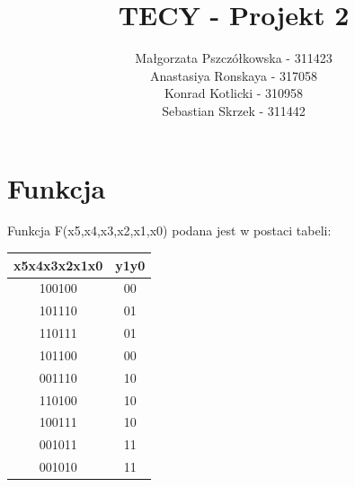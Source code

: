 \documentclass[]{article}
\title{TECY - Projekt 2}
\author{Małgorzata Pszczółkowska - 311423\\ Anastasiya Ronskaya - 317058 \\ Konrad Kotlicki - 310958 \\Sebastian Skrzek - 311442}
\begin{document}
\maketitle
\tableofcontents
\section{Funkcja}
Funkcja F(x5,x4,x3,x2,x1,x0) podana jest w postaci tabeli:
\newline
\newline
\begin{tabular}[]{|c|c|}
\hline
   \footnotesize{x5x4x3x2x1x0} & \footnotesize{y1y0}\\
\hline   
   100100 & 00\\
   101110 & 01\\
   110111 & 01\\
   101100 & 00\\
   001110 & 10\\
   110100 & 10\\
   100111 & 10\\
   001011 & 11\\
   001010 & 11\\
\hline
\end{tabular}
\end{document}
